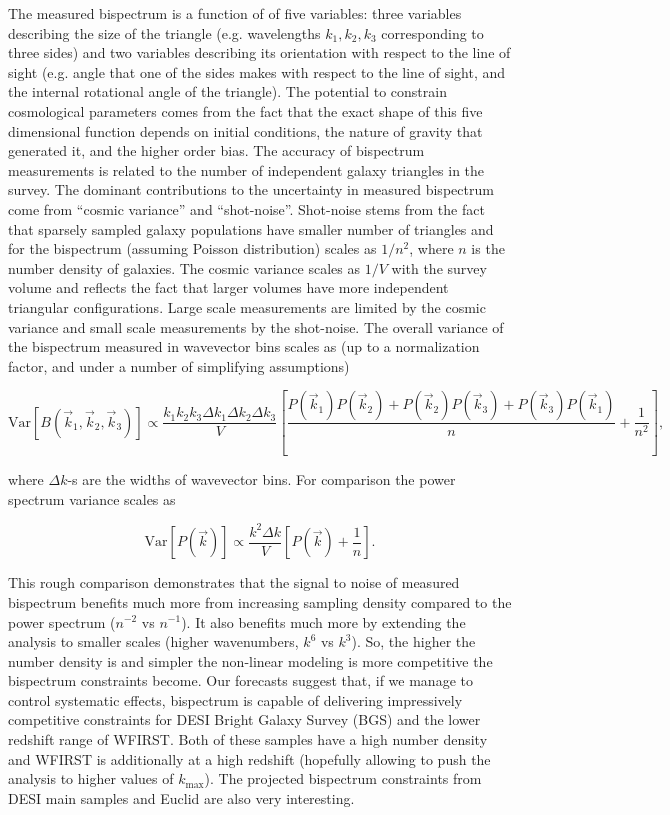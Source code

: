 The measured bispectrum is a function of of five variables: three variables describing the size of the triangle (e.g.
wavelengths $k_1, k_2, k_3$ corresponding to three sides) and two variables
describing its orientation with respect to the line of sight (e.g. angle that
one of the sides makes with respect to the line of sight, and the internal
rotational angle of the triangle). The potential to constrain cosmological
parameters comes from the fact that the exact shape of this  five dimensional
function depends on initial conditions, the nature of gravity that generated
it, and the higher order bias. The accuracy of bispectrum measurements is
related to the number of independent galaxy triangles in the survey. The
dominant contributions to the uncertainty in measured bispectrum come from
``cosmic variance'' and ``shot-noise''. Shot-noise stems from the fact that
sparsely sampled galaxy populations have smaller number of triangles and for
the bispectrum (assuming Poisson distribution) scales as  $1/n^2$, where $n$ is
the number density of galaxies. The cosmic variance scales as $1/V$ with the
survey volume and reflects the fact that larger volumes have more independent
triangular configurations. Large scale measurements are limited by the cosmic
variance and small scale measurements by the shot-noise. The overall variance
of the bispectrum measured in wavevector bins scales as (up to a normalization
factor, and under a number of simplifying assumptions)  

\begin{equation}
\mathrm{Var}\left[B(\vec{k}_1,\vec{k}_2,\vec{k}_3)\right] \propto
\frac{k_1k_2k_3\Delta k_1\Delta k_2\Delta
k_3}{V}\left[\frac{P(\vec{k}_1)P(\vec{k}_2) + P(\vec{k}_2)P(\vec{k}_3) +
P(\vec{k}_3)P(\vec{k}_1)}{n} + \frac{1}{n^2}\right], 
\end{equation} 

where $\Delta k$-s are the widths of wavevector bins. For comparison the power
spectrum variance scales as 

\begin{equation}
\mathrm{Var}\left[P(\vec{k})\right] \propto \frac{k^2\Delta
k}{V}\left[P(\vec{k}) + \frac{1}{n}\right].  
\end{equation}  

This rough comparison demonstrates that the signal to noise of measured
bispectrum benefits much more from increasing sampling density  compared to
the power spectrum ($n^{-2}$ vs $n^{-1}$). It also benefits much more by
extending the analysis to smaller scales (higher wavenumbers, $k^6$ vs
$k^3$). So, the higher the number density is and simpler the non-linear
modeling is more competitive the bispectrum constraints become. Our forecasts
suggest that, if we manage to control systematic effects, bispectrum is capable
of delivering impressively competitive constraints for DESI Bright Galaxy
Survey (BGS) and the lower redshift range of WFIRST. Both of these samples have
a high number density and WFIRST is additionally at a high redshift (hopefully
allowing to push the analysis to higher values of $k_\mathrm{max}$). The
projected bispectrum constraints from DESI main samples and Euclid are also
very interesting.

